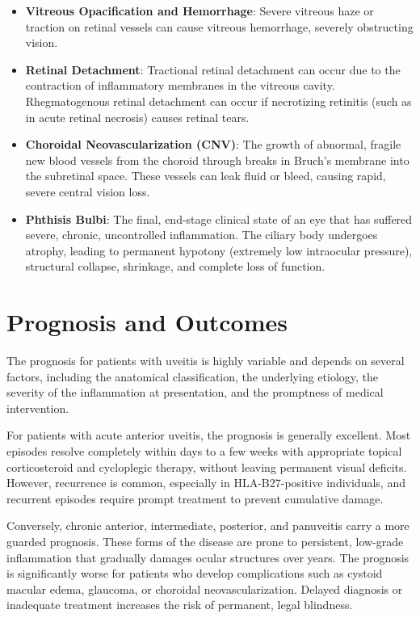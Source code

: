 \begin{itemize}
    \item \textbf{Vitreous Opacification and Hemorrhage}: Severe vitreous haze or traction on retinal vessels can cause vitreous hemorrhage, severely obstructing vision.
    \item \textbf{Retinal Detachment}: Tractional retinal detachment can occur due to the contraction of inflammatory membranes in the vitreous cavity. Rhegmatogenous retinal detachment can occur if necrotizing retinitis (such as in acute retinal necrosis) causes retinal tears.
    \item \textbf{Choroidal Neovascularization (CNV)}: The growth of abnormal, fragile new blood vessels from the choroid through breaks in Bruch's membrane into the subretinal space. These vessels can leak fluid or bleed, causing rapid, severe central vision loss.
    \item \textbf{Phthisis Bulbi}: The final, end-stage clinical state of an eye that has suffered severe, chronic, uncontrolled inflammation. The ciliary body undergoes atrophy, leading to permanent hypotony (extremely low intraocular pressure), structural collapse, shrinkage, and complete loss of function.
\end{itemize}

\section*{Prognosis and Outcomes}
The prognosis for patients with uveitis is highly variable and depends on several factors, including the anatomical classification, the underlying etiology, the severity of the inflammation at presentation, and the promptness of medical intervention.

For patients with acute anterior uveitis, the prognosis is generally excellent. Most episodes resolve completely within days to a few weeks with appropriate topical corticosteroid and cycloplegic therapy, without leaving permanent visual deficits. However, recurrence is common, especially in HLA-B27-positive individuals, and recurrent episodes require prompt treatment to prevent cumulative damage.

Conversely, chronic anterior, intermediate, posterior, and panuveitis carry a more guarded prognosis. These forms of the disease are prone to persistent, low-grade inflammation that gradually damages ocular structures over years. The prognosis is significantly worse for patients who develop complications such as cystoid macular edema, glaucoma, or choroidal neovascularization. Delayed diagnosis or inadequate treatment increases the risk of permanent, legal blindness.

